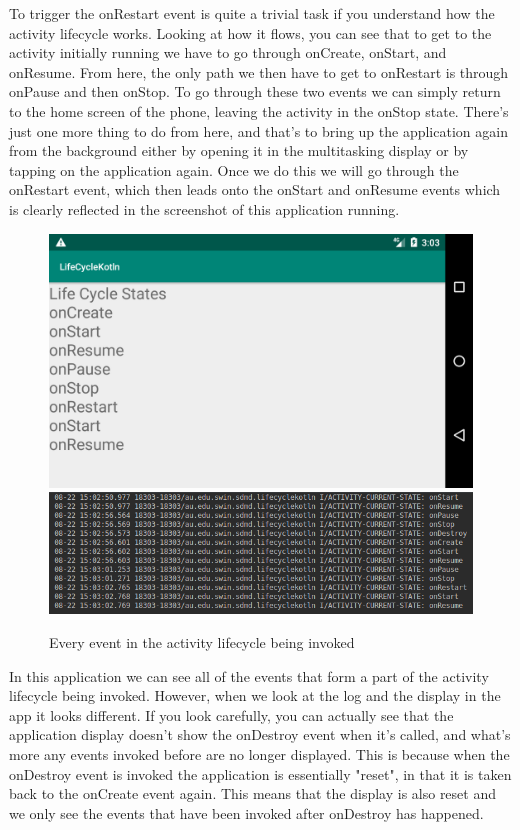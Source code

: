 \documentclass{scrartcl}
\begin{document}
To trigger the onRestart event is quite a trivial task if you understand how the activity lifecycle
works. Looking at how it flows, you can see that to get to the activity initially running we have to
go through onCreate, onStart, and onResume. From here, the only path we then have to get to onRestart
is through onPause and then onStop. To go through these two events we can simply return to the home
screen of the phone, leaving the activity in the onStop state. There's just one more thing to do from
here, and that's to bring up the application again from the background either by opening it in the
multitasking display or by tapping on the application again. Once we do this we will go through the
onRestart event, which then leads onto the onStart and onResume events which is clearly reflected in
the screenshot of this application running.

\pagebreak

\begin{figure}[h]
    \centering
    \includegraphics[scale=0.2]{images/lifecycle.png}
    \includegraphics[scale=0.6]{images/lifecyclelog.png}
    \caption{Every event in the activity lifecycle being invoked}
\end{figure}

In this application we can see all of the events that form a part of the activity lifecycle being
invoked. However, when we look at the log and the display in the app it looks different. If you
look carefully, you can actually see that the application display doesn't show the onDestroy event
when it's called, and what's more any events invoked before are no longer displayed. This is because
when the onDestroy event is invoked the application is essentially "reset", in that it is taken back
to the onCreate event again. This means that the display is also reset and we only see the events
that have been invoked after onDestroy has happened.
\end{document}
